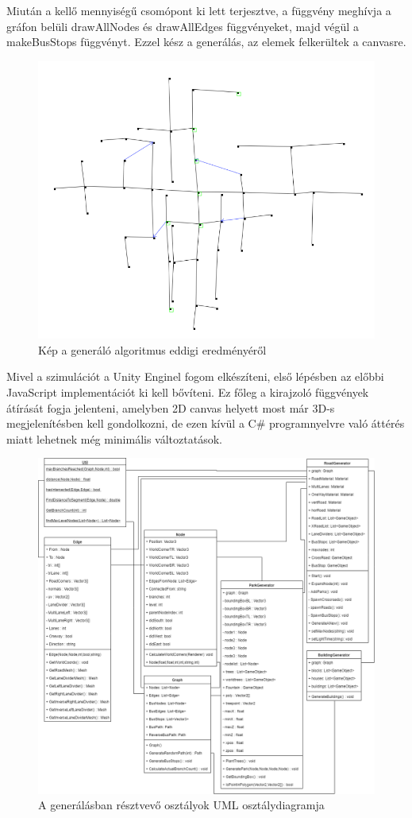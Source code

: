 Miután a kellő mennyiségű csomópont ki lett terjesztve, a függvény meghívja a gráfon belüli drawAllNodes és drawAllEdges függvényeket, majd végül a makeBusStops függvényt. Ezzel kész a generálás, az elemek felkerültek a canvasre.
\begin{figure}[H]
\includegraphics[width=\linewidth]{graph.png}
\caption{Kép a generáló algoritmus eddigi eredményéről}
\label{fig:graph}
\end{figure}
Mivel a szimulációt a Unity Enginel fogom elkészíteni, első lépésben az előbbi JavaScript implementációt ki kell bővíteni. Ez főleg a kirajzoló függvények átírását fogja jelenteni, amelyben 2D canvas helyett most már 3D-s megjelenítésben kell gondolkozni, de ezen kívül a C\# programnyelvre való áttérés miatt lehetnek még minimális változtatások.
\begin{figure}[H]
\includegraphics[scale=0.45,keepaspectratio]{generateuml.png}
\caption{A generálásban résztvevő osztályok UML osztálydiagramja}
\label{fig:genuml}
\end{figure}
